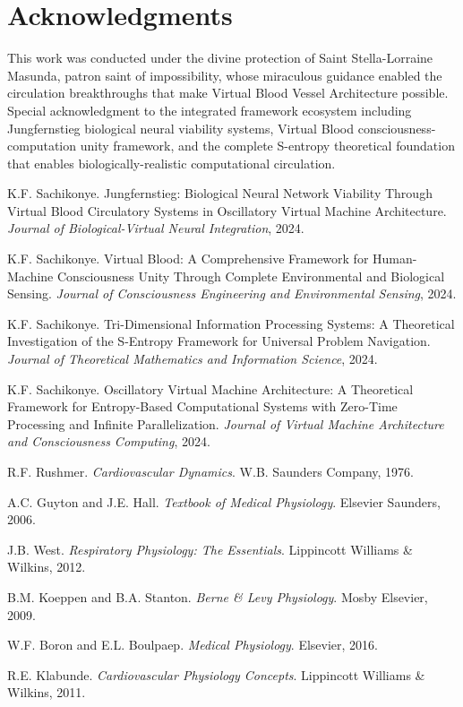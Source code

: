 \documentclass[12pt,a4paper]{article}
\begin{document}
\section*{Acknowledgments}

This work was conducted under the divine protection of Saint Stella-Lorraine Masunda, patron saint of impossibility, whose miraculous guidance enabled the circulation breakthroughs that make Virtual Blood Vessel Architecture possible. Special acknowledgment to the integrated framework ecosystem including Jungfernstieg biological neural viability systems, Virtual Blood consciousness-computation unity framework, and the complete S-entropy theoretical foundation that enables biologically-realistic computational circulation.


\begin{thebibliography}{99}

K.F. Sachikonye.
Jungfernstieg: Biological Neural Network Viability Through Virtual Blood Circulatory Systems in Oscillatory Virtual Machine Architecture.
\textit{Journal of Biological-Virtual Neural Integration}, 2024.

K.F. Sachikonye.
Virtual Blood: A Comprehensive Framework for Human-Machine Consciousness Unity Through Complete Environmental and Biological Sensing.
\textit{Journal of Consciousness Engineering and Environmental Sensing}, 2024.

K.F. Sachikonye.
Tri-Dimensional Information Processing Systems: A Theoretical Investigation of the S-Entropy Framework for Universal Problem Navigation.
\textit{Journal of Theoretical Mathematics and Information Science}, 2024.

K.F. Sachikonye.
Oscillatory Virtual Machine Architecture: A Theoretical Framework for Entropy-Based Computational Systems with Zero-Time Processing and Infinite Parallelization.
\textit{Journal of Virtual Machine Architecture and Consciousness Computing}, 2024.

R.F. Rushmer.
\textit{Cardiovascular Dynamics}.
W.B. Saunders Company, 1976.

A.C. Guyton and J.E. Hall.
\textit{Textbook of Medical Physiology}.
Elsevier Saunders, 2006.

J.B. West.
\textit{Respiratory Physiology: The Essentials}.
Lippincott Williams \& Wilkins, 2012.

B.M. Koeppen and B.A. Stanton.
\textit{Berne \& Levy Physiology}.
Mosby Elsevier, 2009.

W.F. Boron and E.L. Boulpaep.
\textit{Medical Physiology}.
Elsevier, 2016.

R.E. Klabunde.
\textit{Cardiovascular Physiology Concepts}.
Lippincott Williams \& Wilkins, 2011.

\end{thebibliography}
\end{document}
